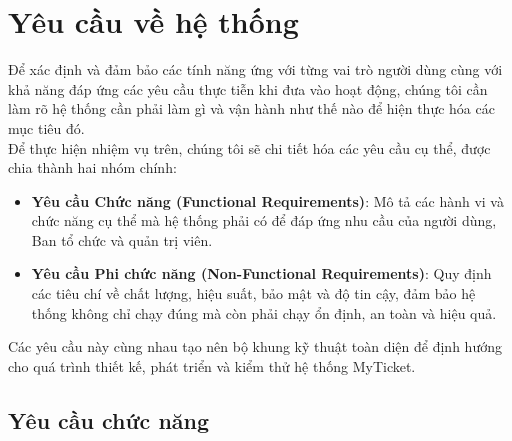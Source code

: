\section{Yêu cầu về hệ thống}
\indent \indent Để xác định và đảm bảo các tính năng ứng với từng vai trò người dùng cùng với khả năng đáp ứng các yêu cầu thực tiễn khi đưa vào hoạt động, chúng tôi cần làm rõ hệ thống cần phải làm gì và vận hành như thế nào để hiện thực hóa các mục tiêu đó. \\
\indent Để thực hiện nhiệm vụ trên, chúng tôi sẽ chi tiết hóa các yêu cầu cụ thể, được chia thành hai nhóm chính: 
\begin{itemize}[leftmargin=3em]
    \item[1. ] \textbf{Yêu cầu Chức năng (Functional Requirements)}: Mô tả các hành vi và chức năng cụ thể mà hệ thống phải có để đáp ứng nhu cầu của người dùng, Ban tổ chức và quản trị viên.
    \item[2. ] \textbf{Yêu cầu Phi chức năng (Non-Functional Requirements)}: Quy định các tiêu chí về chất lượng, hiệu suất, bảo mật và độ tin cậy, đảm bảo hệ thống không chỉ chạy đúng mà còn phải chạy ổn định, an toàn và hiệu quả. 
\end{itemize}
\indent \indent Các yêu cầu này cùng nhau tạo nên bộ khung kỹ thuật toàn diện để định hướng cho quá trình thiết kế, phát triển và kiểm thử hệ thống MyTicket.
\subsection{Yêu cầu chức năng}
